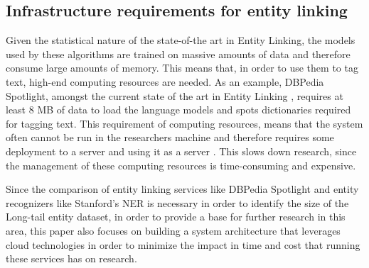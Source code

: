 \subsection{Infrastructure requirements for entity linking}
Given the statistical nature of the state-of-the art in Entity Linking, the models used by these algorithms are trained on massive amounts of data and therefore consume large amounts of memory.
This means that, in order to use them to tag text, high-end computing resources are needed.
As an example, DBPedia Spotlight, amongst the current state of the art in Entity Linking \cite{rizzo2012nerd},
requires at least 8 MB of data \cite{rw_elo_isem2013daiber} to load the language models and spots dictionaries required for tagging text.
This requirement of computing resources, means that the system often cannot be run in the researchers machine
and therefore requires some deployment to a server and using it as a server \cite{rw_elo_spotlightwebservice}.
This slows down research, since the management of these computing resources is time-consuming and expensive.

Since the comparison of entity linking services like DBPedia Spotlight and entity recognizers like Stanford's NER
is necessary in order to identify the size of the Long-tail entity dataset,
in order to provide a base for further research in this area, this paper also focuses on building a system architecture that leverages cloud technologies in order to minimize the impact in time and cost that running these services has on research. 

